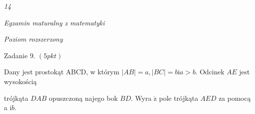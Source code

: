 \documentclass[a4paper,12pt]{article}
\begin{document}
{\it 14}

{\it Egzamin maturalny z matematyki}

{\it Poziom rozszerzony}

Zadanie 9. $(5pkt)$

Dany jest prostokąt ABCD, w którym $|AB|=a, |BC|=b \mathrm{i}a>b$. Odcinek $AE$ jest wysokością

trójkąta $DAB$ opuszczoną najego bok $BD.$ Wyra $\acute{\mathrm{z}}$ pole trójkąta $AED$ za pomocą a $\mathrm{i}b.$
\end{document}
